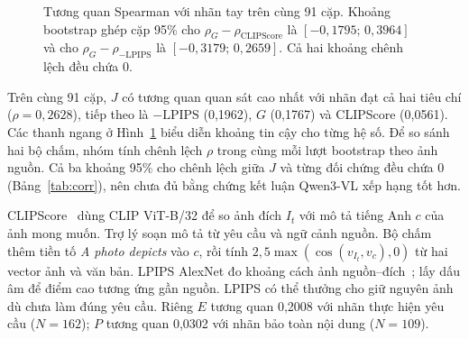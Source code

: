\begin{figure}[!ht]\centering
{}
\caption{Tương quan Spearman với nhãn tay trên cùng 91 cặp. Khoảng bootstrap
ghép cặp 95\% cho $\rho_G-\rho_{\mathrm{CLIPScore}}$ là
$[-0{,}1795;\,0{,}3964]$ và cho $\rho_G-\rho_{-\mathrm{LPIPS}}$ là
$[-0{,}3179;\,0{,}2659]$. Cả hai khoảng chênh lệch đều chứa 0.}\label{fig:nv3-corr}
\end{figure}

Trên cùng 91 cặp, $J$ có tương quan quan sát cao nhất với nhãn đạt cả hai tiêu chí ($\rho=0{,}2628$), tiếp theo là $-\mathrm{LPIPS}$ (0,1962), $G$ (0,1767) và CLIPScore (0,0561). Các thanh ngang ở Hình~\ref{fig:nv3-corr} biểu diễn khoảng tin cậy cho từng hệ số. Để so sánh hai bộ chấm, nhóm tính chênh lệch $\rho$ trong cùng mỗi lượt bootstrap theo ảnh nguồn. Cả ba khoảng 95\% cho chênh lệch giữa $J$ và từng đối chứng đều chứa 0 (Bảng~\ref{tab:corr}), nên chưa đủ bằng chứng kết luận Qwen3-VL xếp hạng tốt hơn.

CLIPScore~\cite{hessel2021clipscore} dùng CLIP ViT-B/32 để so ảnh đích $I_t$
với mô tả tiếng Anh $c$ của ảnh mong muốn. Trợ lý soạn mô tả từ yêu cầu và
ngữ cảnh nguồn. Bộ chấm thêm tiền tố \textit{A photo depicts} vào $c$, rồi
tính $2{,}5\max(\cos(v_{I_t},v_c),0)$ từ hai vector ảnh và văn bản. LPIPS AlexNet đo khoảng cách ảnh
nguồn--đích~\cite{zhang2018lpips}; lấy dấu âm để điểm cao tương ứng gần nguồn.
LPIPS có thể thưởng cho giữ nguyên ảnh dù chưa làm đúng yêu cầu.
Riêng $E$ tương quan 0,2008 với nhãn thực hiện yêu cầu ($N=162$);
$P$ tương quan 0,0302 với nhãn bảo toàn nội dung ($N=109$).




